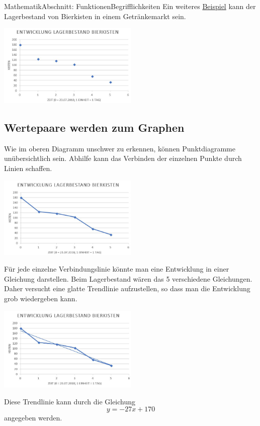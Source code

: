 \documentclass[11pt,twocolumn,oneside,openany,headings=optiontotoc,11pt,numbers=noenddot]{article}
\begin{document}
\begin{worksheet}{Mathematik}{Abschnitt: Funktionen}{Begrifflichkeiten}
		Ein weiteres \underline{Beispiel} kann der Lagerbestand von Bierkisten in einem Getränkemarkt sein.\\
		\par\bigskip\noindent
		\includegraphics[width=0.5\textwidth]{../99_Bilder/bier.jpg}
		\subsection{Wertepaare werden zum Graphen}
		Wie im oberen Diagramm unschwer zu erkennen, können Punktdiagramme unübersichtlich sein. Abhilfe kann das Verbinden der einzelnen Punkte durch Linien schaffen.\\
		\par\bigskip\noindent
		\includegraphics[width=0.5\textwidth]{../99_Bilder/bier1.jpg}\\
		\par\bigskip\noindent
		Für jede einzelne Verbindungslinie könnte man eine Entwicklung in einer Gleichung darstellen. Beim Lagerbestand wären das 5 verschiedene Gleichungen.\\
		Daher versucht eine glatte Trendlinie aufzustellen, so dass man die Entwicklung grob wiedergeben kann.\\
		\par\bigskip\noindent
		\includegraphics[width=0.5\textwidth]{../99_Bilder/bier2.jpg}\\
		\par\bigskip\noindent
		Diese Trendlinie kann durch die Gleichung
		\[y = -27x + 170\]
		angegeben werden.

\end{worksheet}
\end{document}
